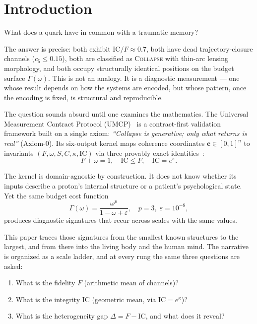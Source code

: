 \documentclass[
  aps,
  prd,
  twocolumn,
  superscriptaddress,
  nofootinbib,
  floatfix
]{revtex4-2}
\newcommand{\Gam}{\Gamma}
\newcommand{\eps}{\varepsilon}
\newcommand{\beq}{\begin{equation}}
\newcommand{\eeq}{\end{equation}}
\newcommand{\regime}[1]{\textsc{#1}}
\newcommand{\tvec}{\mathbf{c}}
\newcommand{\IC}{\mathrm{IC}}
\begin{document}
\maketitle

\section{Introduction}\label{sec:intro}

What does a quark have in common with a traumatic memory?

The answer is precise: both exhibit $\IC/F \approx 0.7$,
both have dead trajectory-closure channels ($c_5 \leq 0.15$),
both are classified as \regime{Collapse} with thin-arc
lensing morphology, and both occupy structurally identical
positions on the budget surface $\Gam(\omega)$.  This is not
an analogy.  It is a diagnostic measurement --- one whose
result depends on how the systems are encoded, but whose
pattern, once the encoding is fixed, is structural and
reproducible.

The question sounds absurd until one examines the mathematics.
The Universal Measurement Contract Protocol
(UMCP)~\cite{paulus2025umcp,paulus2025physicscoherence} is a
contract-first validation framework built on a single axiom:
\emph{``Collapse is generative; only what returns is real''}
(Axiom-0).  Its six-output kernel maps coherence coordinates
$\tvec \in [0,1]^n$ to invariants
$(F, \omega, S, C, \kappa, \IC)$ via three provably exact
identities~\cite{paulus2026umcpcasepack}:
\beq\label{eq:tier1}
  F + \omega = 1, \quad
  \IC \leq F, \quad
  \IC = e^{\kappa}.
\eeq

The kernel is domain-agnostic by construction.  It does not know
whether its inputs describe a proton's internal structure or a
patient's psychological state.  Yet the same budget cost function
\beq\label{eq:gamma}
  \Gam(\omega) = \frac{\omega^p}{1 - \omega + \eps},
  \quad p = 3,\;\eps = 10^{-8},
\eeq
produces diagnostic signatures that recur across scales with
the same values.

This paper traces those signatures from the smallest known
structures to the largest, and from there into the living body
and the human mind.  The narrative is organized as a scale ladder,
and at every rung the same three questions are asked:
\begin{enumerate}
\item What is the fidelity $F$ (arithmetic mean of channels)?
\item What is the integrity $\IC$ (geometric mean, via
  $\IC = e^{\kappa}$)?
\item What is the heterogeneity gap $\Delta = F - \IC$, and
  what does it reveal?
\end{enumerate}
\end{document}
